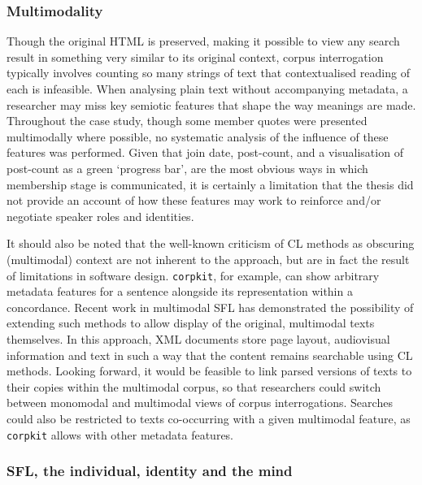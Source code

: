 \subsubsection{Multimodality}

Though the original \gls{HTML} is preserved, making it possible to view any search result in something very similar to its original context, \gls{corpus} interrogation typically involves counting so many strings of text that contextualised reading of each is infeasible. When analysing plain text without accompanying metadata, a researcher may miss key semiotic features that shape the way meanings are made. Throughout the case study, though some member quotes were presented multimodally where possible, no systematic analysis of the influence of these features was performed. Given that join date, post\hyp{}count, and a visualisation of post\hyp{}count as a green `progress bar', are the most obvious ways in which membership stage is communicated, it is certainly a limitation that the thesis did not provide an account of how these features may work to reinforce and\slash or negotiate speaker roles and identities.

It should also be noted that the well\hyp{}known criticism of \gls{CL} methods as obscuring (multimodal) context are not inherent to the approach, but are in fact the result of limitations in software design. \texttt{corpkit}, for example, can show arbitrary metadata features for a sentence alongside its representation within a concordance. Recent work in multimodal \gls{SFL} \cite[e.g.][]{hiippala2015,hiippala2016,ohalloran_multimodal_2013} has demonstrated the possibility of extending such methods to allow display of the original, multimodal texts themselves. In this approach, \gls{XML} documents store page layout, audiovisual information and text in such a way that the content remains searchable using \gls{CL} methods. Looking forward, it would be feasible to link parsed versions of texts to their copies within the multimodal \gls{corpus}, so that researchers could switch between monomodal and multimodal views of \gls{corpus} interrogations. Searches could also be restricted to texts co\hyp{}occurring with a given multimodal feature, as \texttt{corpkit} allows with other metadata features. 


\subsubsection{SFL, the individual, identity and the mind}

